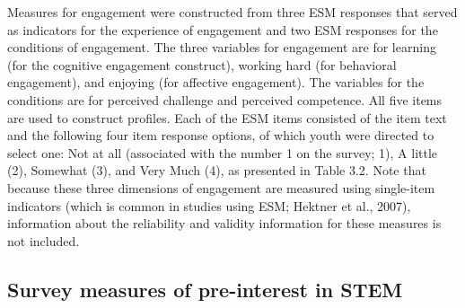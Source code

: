\documentclass[]{book}
\theoremstyle{definition}
\theoremstyle{definition}
\theoremstyle{definition}
\theoremstyle{remark}
\begin{document}
Measures for engagement were constructed from three ESM responses that
served as indicators for the experience of engagement and two ESM
responses for the conditions of engagement. The three variables for
engagement are for learning (for the cognitive engagement construct),
working hard (for behavioral engagement), and enjoying (for affective
engagement). The variables for the conditions are for perceived
challenge and perceived competence. All five items are used to construct
profiles. Each of the ESM items consisted of the item text and the
following four item response options, of which youth were directed to
select one: Not at all (associated with the number 1 on the survey; 1),
A little (2), Somewhat (3), and Very Much (4), as presented in Table
3.2. Note that because these three dimensions of engagement are measured
using single-item indicators (which is common in studies using ESM;
Hektner et al., 2007), information about the reliability and validity
information for these measures is not included.

\begin{table}

\caption{\label{tab:unnamed-chunk-4}ESM measures for profiles}
\centering
{}
\end{table}

\subsection{Survey measures of pre-interest in
STEM}\label{survey-measures-of-pre-interest-in-stem}
\end{document}
